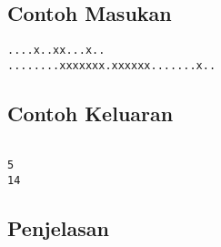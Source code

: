 \documentclass{article}
\begin{document}
\begin{multicols}{2}
\subsection*{Contoh Masukan}
\begin{lstlisting}
....x..xx...x..
........xxxxxxx.xxxxxx.......x..
\end{lstlisting}
\columnbreak
\subsection*{Contoh Keluaran}
\begin{lstlisting}

5
14
\end{lstlisting}
\vfill
\null
\end{multicols}

\subsection*{Penjelasan}
 

\pagebreak
\end{document}
